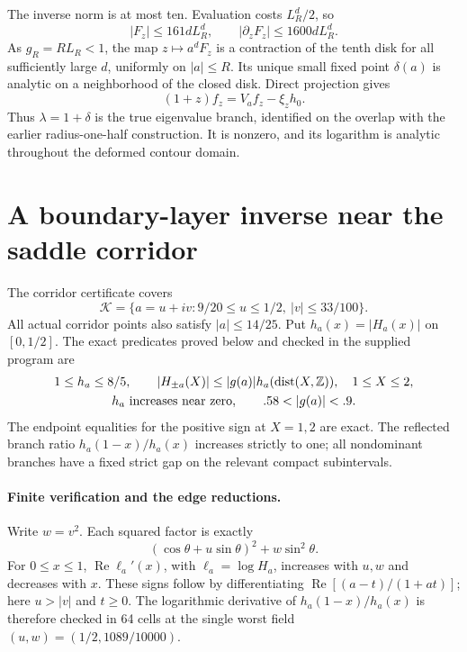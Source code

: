 \documentclass[11pt,a4paper]{article}
\newcommand{\dist}{\operatorname{dist}}\newcommand{\Rea}{\operatorname{Re}}
\begin{document}
The inverse norm is at most ten. Evaluation costs $L_R^d/2$, so
\begin{equation}\label{eq:Fz}
 |F_z|\le161dL_R^d,\qquad |\partial_zF_z|\le1600dL_R^d.
\end{equation}
As $g_R=RL_R<1$, the map $z\mapsto a^dF_z$ is a contraction of the tenth disk for all sufficiently large $d$, uniformly on $|a|\le R$. Its unique small fixed point $\delta(a)$ is analytic on a neighborhood of the closed disk. Direct projection gives
\begin{equation}\label{eq:param}
 (1+z)f_z=V_af_z-\xi_zh_0.
\end{equation}
Thus $\lambda=1+\delta$ is the true eigenvalue branch, identified on the overlap with the earlier radius-one-half construction. It is nonzero, and its logarithm is analytic throughout the deformed contour domain.

\section{A boundary-layer inverse near the saddle corridor}
The corridor certificate covers
\begin{equation}\label{eq:rect}
 \mathcal K=\{a=u+iv:9/20\le u\le1/2,\ |v|\le33/100\}.
\end{equation}
All actual corridor points also satisfy $|a|\le14/25$. Put $h_a(x)=|H_a(x)|$ on $[0,1/2]$. The exact predicates proved below and checked in the supplied program are
\begin{gather}\label{eq:base}
 1\le h_a\le8/5,\qquad
 |H_{\pm a}(X)|\le |g(a)|h_a(\dist(X,\mathbb Z)),\quad 1\le X\le2,\\
 h_a\text{ increases near zero},\qquad .58<|g(a)|<.9.\notag
\end{gather}
The endpoint equalities for the positive sign at $X=1,2$ are exact. The reflected branch ratio $h_a(1-x)/h_a(x)$ increases strictly to one; all nondominant branches have a fixed strict gap on the relevant compact subintervals.

\paragraph{Finite verification and the edge reductions.}
Write $w=v^2$. Each squared factor is exactly
\[
 (\cos\theta+u\sin\theta)^2+w\sin^2\theta.
\]
For $0\le x\le1$, $\Rea\ell_a'(x)$, with $\ell_a=\log H_a$, increases with $u,w$ and decreases with $x$. These signs follow by differentiating
$\Rea[(a-t)/(1+at)]$; here $u>|v|$ and $t\ge0$. The logarithmic derivative of $h_a(1-x)/h_a(x)$ is therefore checked in 64 cells at the single worst field $(u,w)=(1/2,1089/10000)$.
\end{document}
